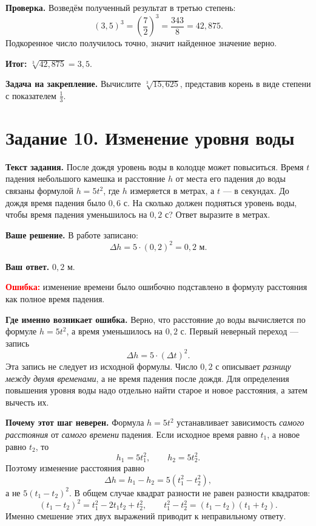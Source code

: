 \documentclass[12pt,a4paper]{article}
\begin{document}
\textbf{Проверка.} Возведём полученный результат в третью степень:
\[
(3{,}5)^3=\left(\frac72\right)^3
=\frac{343}{8}=42{,}875.
\]
Подкоренное число получилось точно, значит найденное значение верно.

\textcolor{teal!60!black}{\textbf{Итог:}} $\boxed{\sqrt[3]{42{,}875}=3{,}5}$.

\textbf{Задача на закрепление.} Вычислите $\sqrt[3]{15{,}625}$, представив корень в виде степени с показателем $\frac13$.

\newpage
{}\label{task:10}
\section*{Задание 10. Изменение уровня воды}
\textbf{Текст задания.} После дождя уровень воды в колодце может повыситься. Время $t$ падения небольшого камешка и расстояние $h$ от места его падения до воды связаны формулой $h=5t^2$, где $h$ измеряется в метрах, а $t$ --- в секундах. До дождя время падения было $0{,}6$ с. На сколько должен подняться уровень воды, чтобы время падения уменьшилось на $0{,}2$ с? Ответ выразите в метрах.

\textbf{Ваше решение.} В работе записано:
\[
\Delta h=5\cdot(0{,}2)^2=0{,}2\text{ м}.
\]

\textbf{Ваш ответ.} $0{,}2$ м.

\textcolor{red}{\textbf{Ошибка:}} изменение времени было ошибочно подставлено в формулу расстояния как полное время падения.

\textbf{Где именно возникает ошибка.} Верно, что расстояние до воды вычисляется по формуле $h=5t^2$, а время уменьшилось на $0{,}2$ с. Первый неверный переход --- запись
\[
\Delta h=5\cdot(\Delta t)^2.
\]
Эта запись не следует из исходной формулы. Число $0{,}2$ с описывает \emph{разницу между двумя временами}, а не время падения после дождя. Для определения повышения уровня воды надо отдельно найти старое и новое расстояния, а затем вычесть их.

\textbf{Почему этот шаг неверен.} Формула $h=5t^2$ устанавливает зависимость \emph{самого расстояния} от \emph{самого времени} падения. Если исходное время равно $t_1$, а новое равно $t_2$, то
\[
h_1=5t_1^2,\qquad h_2=5t_2^2.
\]
Поэтому изменение расстояния равно
\[
\Delta h=h_1-h_2=5(t_1^2-t_2^2),
\]
а не $5(t_1-t_2)^2$. В общем случае квадрат разности не равен разности квадратов:
\[
(t_1-t_2)^2=t_1^2-2t_1t_2+t_2^2,
\qquad t_1^2-t_2^2=(t_1-t_2)(t_1+t_2).
\]
Именно смешение этих двух выражений приводит к неправильному ответу.
\end{document}
